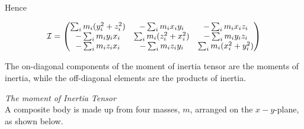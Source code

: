 Hence
\begin{definition}
  \label{def:momentofinertiatens}
\[
{\cal I} = \begin{pmatrix}
  \sum_i m_i  (y_i^2 + z_i^2 ) & - \sum_i m_i  x_i y_i & - \sum_i m_i  x_i z_i \\
  - \sum_i m_i  y_i x_i & \sum_i m_i  (z_i^2 + x_i^2) & - \sum_i m_i  y_i z_i \\
  - \sum_i m_i z_i x_i & - \sum_i m_i  z_i y_i & \sum_i m_i  (x_i^2 + y_i^2)
\end{pmatrix} 
\]
\end{definition}
The on-diagonal components of the moment of inertia tensor are the
moments of inertia, while the off-diagonal elements are the products
of inertia.

\begin{example}{\em The moment of Inertia Tensor}\\
  A composite body is made up from four masses, $m$, arranged on the
  $x-y$-plane, as shown below.
\begin{center}
\end{center}
\end{example}
